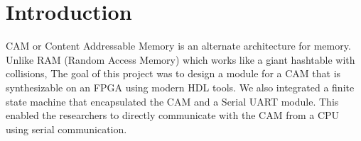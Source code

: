 \section{Introduction}
CAM or Content Addressable Memory is an alternate architecture for memory. Unlike RAM (Random Access Memory) which works like a giant hashtable with collisions, 
The goal of this project was to design a module for a CAM that is synthesizable on an FPGA using modern HDL tools. 
We also integrated a finite state machine that encapsulated the CAM and a Serial UART module. 
This enabled the researchers to directly communicate with the CAM from a CPU using serial communication. 
